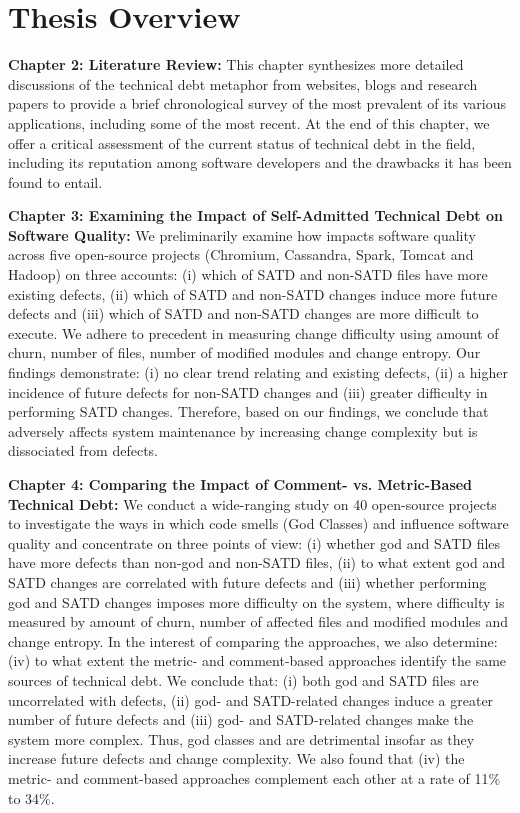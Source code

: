 \fi
 
\section{Thesis Overview}

\textbf{Chapter 2: Literature Review:} This chapter synthesizes more detailed discussions of the technical debt metaphor from websites, blogs and research papers to provide a brief chronological survey of the most prevalent of its various applications, including some of the most recent.  At the end of this chapter, we offer a critical assessment of the current status of technical debt in the field, including its reputation among software developers and the drawbacks it has been found to entail.

\textbf{Chapter 3: Examining the Impact of Self-Admitted Technical Debt on Software Quality:} We preliminarily examine how \SATD impacts software quality across five open-source projects (Chromium, Cassandra, Spark, Tomcat and Hadoop) on three accounts: (i) which of SATD and non-SATD files have more existing defects, (ii) which of SATD and non-SATD changes induce more future defects and (iii) which of SATD and non-SATD changes are more difficult to execute. We adhere to precedent in measuring change difficulty using amount of churn, number of files, number of modified modules and change entropy. Our findings demonstrate: (i) no clear trend relating \SATD and existing defects, (ii) a higher incidence of future defects for non-SATD changes and (iii) greater difficulty in performing SATD changes. Therefore, based on our findings, we conclude that \SATD adversely affects system maintenance by increasing change complexity but is dissociated from defects.

\textbf{Chapter 4: Comparing the Impact of Comment- vs. Metric-Based Technical Debt:} We conduct a wide-ranging study on 40 open-source projects to investigate the ways in which code smells (God Classes) and \SATD influence software quality and concentrate on three points of view: (i) whether god and SATD files have more defects than non-god and non-SATD files, (ii) to what extent god and SATD changes are correlated with future defects and (iii) whether performing god and SATD changes imposes more difficulty on the system, where difficulty is measured by amount of churn, number of affected files and modified modules and change entropy. In the interest of comparing the approaches, we also determine: (iv) to what extent the metric- and comment-based approaches identify the same sources of technical debt. We conclude that: (i) both god and SATD files are uncorrelated with defects, (ii) god- and SATD-related changes induce a greater number of future defects and (iii) god- and SATD-related changes make the system more complex. Thus, god classes and \SATD are detrimental insofar as they increase future defects and change complexity. We also found that (iv) the metric- and comment-based approaches complement each other at a rate of 11\% to 34\%.

